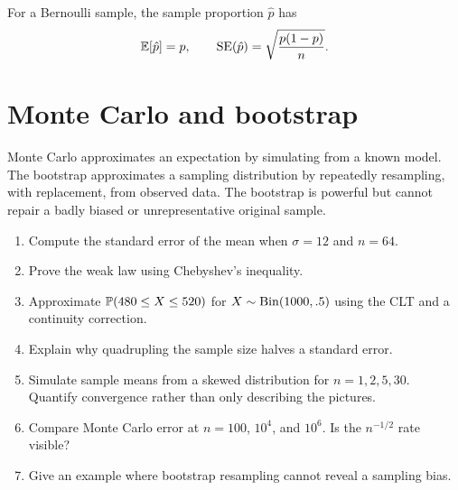 For a Bernoulli sample, the sample proportion $\hat p$ has
\[
\E[\hat p]=p,\qquad
\operatorname{SE}(\hat p)=\sqrt{\frac{p(1-p)}n}.
\]

\section{Monte Carlo and bootstrap}

Monte Carlo approximates an expectation by simulating from a known model. The bootstrap approximates a sampling distribution by repeatedly resampling, with replacement, from observed data. The bootstrap is powerful but cannot repair a badly biased or unrepresentative original sample.

\begin{exercisebox}
\begin{enumerate}
  \item Compute the standard error of the mean when $\sigma=12$ and $n=64$. 
  \item Prove the weak law using Chebyshev's inequality. 
  \item Approximate $\P(480\le X\le520)$ for $X\sim\Bin(1000,.5)$ using the CLT and a continuity correction. 
  \item Explain why quadrupling the sample size halves a standard error. 
  \item Simulate sample means from a skewed distribution for $n=1,2,5,30$. Quantify convergence rather than only describing the pictures. 
  \item Compare Monte Carlo error at $n=100$, $10^4$, and $10^6$. Is the $n^{-1/2}$ rate visible? 
  \item Give an example where bootstrap resampling cannot reveal a sampling bias. 
\end{enumerate}
\end{exercisebox}
